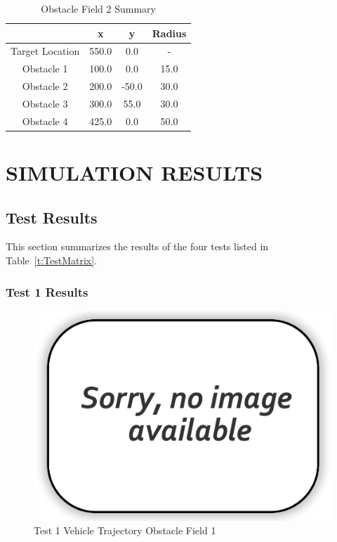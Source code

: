 \documentclass[12pt,twocolumn]{article}
\begin{document}
\begin{table}
\begin{center}
	\begin{tabular}{||c|c|c|c||} 
		\hline
		& x & y & Radius\\
		\hline
		Target Location  & 550.0 & 0.0 & -\\ 
		\hline
		Obstacle 1 & 100.0 & 0.0 & 15.0\\
		\hline
		Obstacle 2 & 200.0 & -50.0 & 30.0\\
		\hline
		Obstacle 3 & 300.0 & 55.0 & 30.0\\
		\hline
		Obstacle 4 & 425.0 & 0.0 & 50.0\\
		\hline
	\end{tabular}
\end{center}
\caption{Obstacle Field 2 Summary}
\label{t:Obst2Summary}
\end{table}


\section{SIMULATION RESULTS}\label{s:results}


\subsection{Test Results}\label{ss:test_results}
This section summarizes the results of the four tests listed in Table~\ref{t:TestMatrix}.

\subsubsection{Test 1 Results}\label{sss:Test1}

\begin{figure}
	\centering
	\includegraphics[width=\columnwidth]{Figs/no-image.png}
	\caption{\small Test 1 Vehicle Trajectory Obstacle Field 1}  
	\label{fig:Test1_Obst1}
\end{figure}
\end{document}
